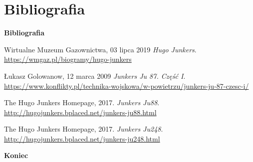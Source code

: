\section{\large{\textbf{Bibliografia}}}

\begin{frame}{\Huge{\textbf{Bibliografia}}}
	\begin{thebibliography}{9}
		Wirtualne Muzeum Gazownictwa, 03 lipca 2019 \emph{Hugo Junkers}.
		\url{https://wmgaz.pl/biogramy/hugo-junkers}
		
		Łukasz Golowanow, 12 marca 2009 \emph{Junkers Ju 87. Część I}. \\
		\url{https://www.konflikty.pl/technika-wojskowa/w-powietrzu/junkers-ju-87-czesc-i/}

		The Hugo Junkers Homepage, 2017. \emph{Junkers Ju88}.
		\url{http://hugojunkers.bplaced.net/junkers-ju88.html}

		The Hugo Junkers Homepage, 2017. \emph{Junkers Ju248}.
		\url{http://hugojunkers.bplaced.net/junkers-ju248.html}
	\end{thebibliography}
\end{frame}

\begin{frame}{\Huge{\textbf{Koniec}}}
	
	\bigskip
\end{frame}